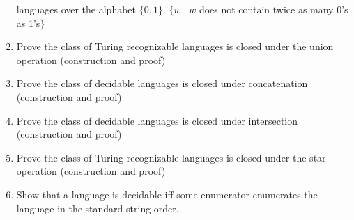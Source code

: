 \documentclass{article}
\begin{document}
\begin{enumerate}
        languages over the alphabet $\{0,1\}$. $\{w\mid w $ does not contain twice as many 0's as 
        1's$\}$
        \item Prove the class of Turing recognizable languages is closed under the union operation 
        (construction and proof)
        \item Prove the class of decidable languages is closed under concatenation (construction 
        and proof)
        \item Prove the class of decidable languages is closed under intersection (construction 
        and proof)
        \item Prove the class of Turing recognizable languages is closed under the star operation 
        (construction and proof)
        \item Show that a language is decidable iff some enumerator enumerates the language in
        the standard string order.
    \end{enumerate}
\end{document}
